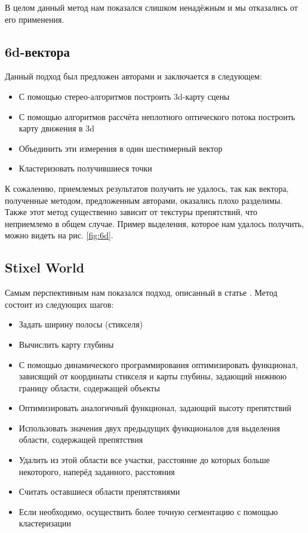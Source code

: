 \documentclass[aps,%
14pt,%
final,%
oneside,
onecolumn,%
musixtex, %
superscriptaddress,%
centertags]{extarticle} %
\begin{document}
В целом данный метод нам показался слишком ненадёжным и мы отказались от его применения.

\subsection{ 6d-вектора }

Данный подход был предложен авторами \cite{franke20056d} и заключается в следующем:
\begin{itemize}
     \item С помощью стерео-алгоритмов построить 3d-карту сцены
     \item С помощью алгоритмов рассчёта неплотного оптического потока построить карту движения в 3d
     \item Объединить эти измерения в один шестимерный вектор
     \item Кластеризовать получившиеся точки
\end{itemize}

К сожалению, приемлемых результатов получить не удалось, так как вектора, полученные методом, предложенным авторами, оказались плохо разделимы. Также этот метод существенно зависит от текстуры препятствий, что неприемлемо в общем случае. Пример выделения, которое нам удалось получить, можно видеть на рис. \ref{fig:6d}.

\subsection{ Stixel World }

Самым перспективным нам показался подход, описанный в статье \cite{pfeiffer2010efficient}. Метод состоит из следующих шагов:

\begin{itemize}
     \item Задать ширину полосы (стикселя)
     \item Вычислить карту глубины
     \item С помощью динамического программирования оптимизировать функционал, зависящий от координаты стикселя и карты глубины, задающий нижнюю границу области, содержащей объекты
     \item Оптимизировать аналогичный функционал, задающий высоту препятствий
     \item Использовать значения двух предыдущих функционалов для выделения области, содержащей препятствия
     \item Удалить из этой области все участки, расстояние до которых больше некоторого, наперёд заданного, расстояния
    \item Считать оставшиеся области препятствиями
    \item Если необходимо, осуществить более точную сегментацию с помощью кластеризации
\end{itemize}
\end{document}
